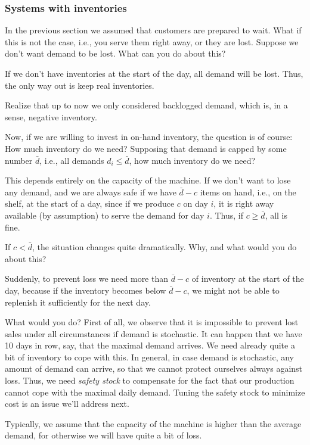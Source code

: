 \subsubsection{Systems with inventories}

\begin{exercise}
  In the previous section we assumed that customers are
  prepared to wait.  What if this is not the case, i.e., you serve
  them right away, or they are lost. Suppose we don't want demand to
  be lost. What can you do about this?


  \begin{solution}
 If we don't have inventories at the start of the day, all demand will be
    lost. Thus, the only way out is  keep real
    inventories. 

Realize that up to now we only considered backlogged
    demand, which is, in a sense, negative inventory.
  \end{solution}
\end{exercise}

\begin{exercise}
  Now, if we are willing to invest in on-hand  inventory, the question is of course:  How much inventory do we need? Supposing that  demand is capped by some number $\bar d$, i.e., all demands $d_i \leq \bar d$, how much inventory do we need?
  \begin{solution}
This depends entirely on the capacity of the machine. If we don't want to lose any demand, and we are always safe if we have $\bar d-c$ items on hand, i.e., on the shelf, at the start of a day, since if we produce $c$ on day $i$, it is right away available (by assumption) to serve the demand for day $i$. Thus, if $c\geq \bar d$, all is fine. 
  \end{solution}
\end{exercise}

\begin{exercise}
  If $c< \bar d$, the situation changes quite dramatically. Why, and what would you do about this?
  \begin{solution}
Suddenly,  to prevent loss we need more than $\bar d-c$ of inventory at the start
  of the day, because if the inventory becomes below $\bar d-c$, we
  might not be able to replenish it sufficiently for the next
  day. 

What would you do? First of all, we observe that it is impossible to prevent lost
    sales under all circumstances if demand is stochastic. It can
    happen that we have 10 days in row, say, that the maximal demand
    arrives. We need already quite a bit of inventory to cope with
    this. In general, in case demand is stochastic, any amount of
    demand can arrive, so that we cannot protect ourselves always
    against loss. Thus, we need \emph{safety stock} to compensate for the fact that
    our production cannot cope with the maximal daily demand. Tuning the safety stock to minimize cost is an issue we'll address
    next. 

    Typically, we assume that the capacity of the machine is higher
    than the average demand, for otherwise we will have quite a bit of
    loss. 
  \end{solution}
\end{exercise}

